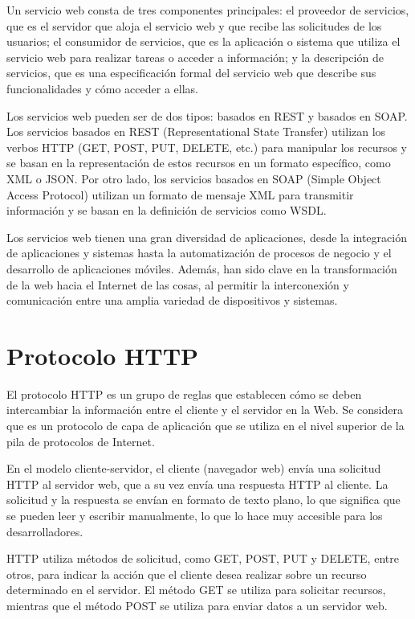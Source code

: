 Un servicio web consta de tres componentes principales: el proveedor de servicios, que es el servidor que aloja el servicio web y que recibe las solicitudes de los usuarios; el consumidor de servicios, que es la aplicación o sistema que utiliza el servicio web para realizar tareas o acceder a información; y la descripción de servicios, que es una especificación formal del servicio web que describe sus funcionalidades y cómo acceder a ellas.

Los servicios web pueden ser de dos tipos: basados en REST y basados en SOAP. Los servicios basados en REST (Representational State Transfer) utilizan los verbos HTTP (GET, POST, PUT, DELETE, etc.) para manipular los recursos y se basan en la representación de estos recursos en un formato específico, como XML o JSON. Por otro lado, los servicios basados en SOAP (Simple Object Access Protocol) utilizan un formato de mensaje XML para transmitir información y se basan en la definición de servicios como WSDL.

Los servicios web tienen una gran diversidad de aplicaciones, desde la integración de aplicaciones y sistemas hasta la automatización de procesos de negocio y el desarrollo de aplicaciones móviles. Además, han sido clave en la transformación de la web hacia el Internet de las cosas, al permitir la interconexión y comunicación entre una amplia variedad de dispositivos y sistemas.

\section{Protocolo HTTP}

El protocolo HTTP \cite{http} es un grupo de reglas que establecen cómo se deben intercambiar la información entre el cliente y el servidor en la Web. Se considera que es un protocolo de capa de aplicación que se utiliza en el nivel superior de la pila de protocolos de Internet.

En el modelo cliente-servidor, el cliente (navegador web) envía una solicitud HTTP al servidor web, que a su vez envía una respuesta HTTP al cliente. La solicitud y la respuesta se envían en formato de texto plano, lo que significa que se pueden leer y escribir manualmente, lo que lo hace muy accesible para los desarrolladores.

HTTP utiliza métodos de solicitud, como GET, POST, PUT y DELETE, entre otros, para indicar la acción que el cliente desea realizar sobre un recurso determinado en el servidor. El método GET se utiliza para solicitar recursos, mientras que el método POST se utiliza para enviar datos a un servidor web.

